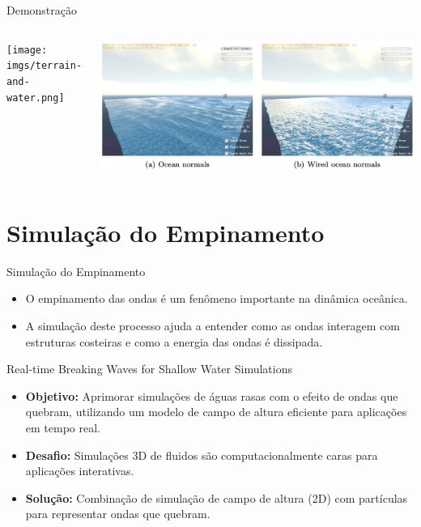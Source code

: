 \documentclass[aspectratio=169,xcolor=table]{beamer}
\begin{document}
\begin{frame}{Demonstração}
    \begin{columns}
        \centering
        \texttt{[image: imgs/terrain-and-water.png]}
        
        \centering
        \includegraphics[width=\textwidth]{imgs/terrain-and-water-2.png}
    \end{columns}
\end{frame}


\section{Simulação do Empinamento}
\begin{frame}{Simulação do Empinamento}
    \begin{itemize}
        \item O empinamento das ondas é um fenômeno importante na dinâmica oceânica.
        \item A simulação deste processo ajuda a entender como as ondas interagem com estruturas costeiras e como a energia das ondas é dissipada.
    \end{itemize}
\end{frame}

\begin{frame}{Real-time Breaking Waves for Shallow Water Simulations}
        \begin{itemize}
        \item \textbf{Objetivo:} Aprimorar simulações de águas rasas com o efeito de ondas que quebram, utilizando um modelo de campo de altura eficiente para aplicações em tempo real.
        \item \textbf{Desafio:} Simulações 3D de fluidos são computacionalmente caras para aplicações interativas.
        \item \textbf{Solução:} Combinação de simulação de campo de altura (2D) com partículas para representar ondas que quebram.
    \end{itemize}
\end{frame}
\end{document}
